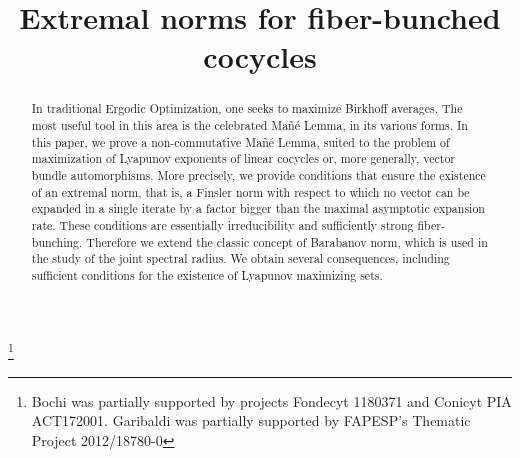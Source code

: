 \documentclass[JEP,XML,SOM,Unicode]{cedram}
\theoremstyle{plain}
\theoremstyle{definition}
\begin{document}
\title{Extremal norms for fiber-bunched cocycles}

\author[\initial{J.} \lastname{Bochi}]{ }
\address{Facultad de Matemáticas, Pontificia Universidad Católica de Chile\\
Avda. Vicuña Mackenna 4860, Macul, Chile}

\author[\initial{E.} \lastname{Garibaldi}]{ }
\address{IMECC, Unicamp\\
Rua Sergio Buarque de Holanda, 651, Cidade Universitária - Barão Geraldo, 13083-859 Campinas - SP, Brazil}


\thanks{Bochi was partially supported by projects Fondecyt 1180371 and Conicyt PIA ACT172001. Garibaldi was partially supported by FAPESP's Thematic Project 2012/18780-0}



\begin{abstract}
In traditional Ergodic Optimization, one seeks to maximize Birkhoff averages. The most useful tool in this area is the celebrated Mañé Lemma, in its various forms. In this paper, we prove a non-commutative Mañé Lemma, suited to the problem of maximization of Lyapunov exponents of linear cocycles or, more generally, vector bundle automorphisms. More precisely, we provide conditions that ensure the existence of an extremal norm, that is, a Finsler norm with respect to which no vector can be expanded in a single iterate by a factor bigger than the maximal asymptotic expansion rate. These conditions are essentially irreducibility and sufficiently strong fiber-bunching. Therefore we extend the classic concept of Barabanov norm, which is used in the study of the joint spectral radius. We obtain several consequences, including sufficient conditions for the existence of Lyapunov maximizing sets.
\end{abstract}


\end{document}

